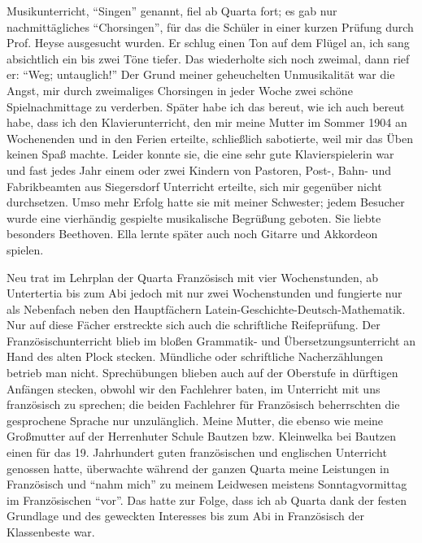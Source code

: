 Musikunterricht, \enquote{Singen} genannt, fiel ab Quarta fort; es gab nur nachmittägliches \enquote{Chorsingen}, für das die Schüler in einer kurzen Prüfung durch Prof. Heyse ausgesucht wurden. Er schlug einen Ton auf dem Flügel an, ich sang absichtlich ein bis zwei Töne tiefer. Das wiederholte sich noch zweimal, dann rief er: \enquote{Weg; untauglich!} Der Grund meiner geheuchelten Unmusikalität war die Angst, mir durch zweimaliges Chorsingen in jeder Woche zwei schöne Spielnachmittage zu verderben. Später habe ich das bereut, wie ich auch bereut habe, dass ich den Klavierunterricht, den mir meine Mutter im Sommer 1904 an Wochenenden und in den Ferien erteilte, schließlich sabotierte, weil mir das Üben keinen Spaß machte. Leider konnte sie, die eine sehr gute Klavierspielerin war und fast jedes Jahr einem oder zwei Kindern von Pastoren, Post-, Bahn- und Fabrikbeamten aus Siegersdorf Unterricht erteilte, sich mir gegenüber nicht durchsetzen. Umso mehr Erfolg hatte sie mit meiner Schwester; jedem Besucher wurde eine vierhändig gespielte musikalische Begrüßung geboten. Sie liebte besonders Beethoven. Ella lernte später auch noch Gitarre und Akkordeon spielen.

Neu trat im Lehrplan der Quarta Französisch mit vier Wochenstunden, ab Untertertia bis zum Abi jedoch mit nur zwei Wochenstunden und fungierte nur als Nebenfach neben den Hauptfächern Latein-Geschichte-Deutsch-Mathematik. Nur auf diese Fächer erstreckte sich auch die schriftliche Reifeprüfung. Der Französischunterricht blieb im bloßen Grammatik- und Übersetzungsunterricht an Hand des alten Plock stecken. Mündliche oder schriftliche Nacherzählungen betrieb man nicht. Sprechübungen blieben auch auf der Oberstufe in dürftigen Anfängen stecken, obwohl wir den Fachlehrer baten, im Unterricht mit uns französisch zu sprechen; die beiden Fachlehrer für Französisch beherrschten die gesprochene Sprache nur unzulänglich. Meine Mutter, die ebenso wie meine Großmutter auf der Herrenhuter Schule Bautzen bzw. Kleinwelka bei Bautzen einen für das 19. Jahrhundert guten französischen und englischen Unterricht genossen hatte, überwachte während der ganzen Quarta meine Leistungen in Französisch und \enquote{nahm mich} zu meinem Leidwesen meistens Sonntagvormittag im Französischen \enquote{vor}. Das hatte zur Folge, dass ich ab Quarta dank der festen Grundlage und des geweckten Interesses bis zum Abi in Französisch der Klassenbeste war.

